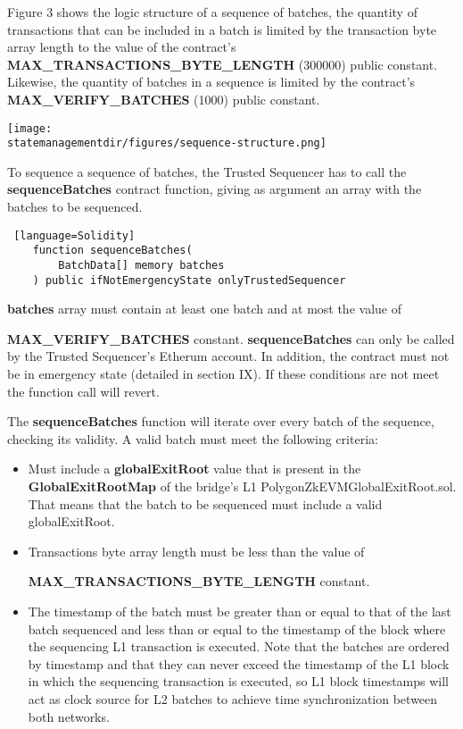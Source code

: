 Figure 3 shows the logic structure of a sequence of batches, the quantity of transactions that can be included in a batch is limited by the transaction byte array length to the value of  the contract's \textbf{MAX\_TRANSACTIONS\_BYTE\_LENGTH} (300000) public constant. Likewise, the quantity of batches in a sequence is limited by the contract's \textbf{MAX\_VERIFY\_BATCHES} (1000) public constant.

\begin{center}
	\texttt{[image: \\statemanagementdir/figures/sequence-structure.png]}
\end{center}


To sequence a sequence of batches, the Trusted Sequencer has to call the \textbf{sequenceBatches} contract function, giving as argument an array with the batches to be sequenced.

\begin{lstlisting} [language=Solidity]
	function sequenceBatches(
		BatchData[] memory batches
	) public ifNotEmergencyState onlyTrustedSequencer	
\end{lstlisting}

\textbf{batches} array must contain at least one batch and at most the value of 

\textbf{MAX\_VERIFY\_BATCHES} constant. \textbf{sequenceBatches} can only be called by the Trusted Sequencer's Etherum account. In addition, the contract must not be in emergency state (detailed in section IX). If these conditions are not meet the function call will revert.

 The \textbf{sequenceBatches} function will iterate over every batch of the sequence, checking its validity. A valid batch must meet the following criteria:
\begin{itemize}
	\item Must include a \textbf{globalExitRoot} value that is present in the \textbf{GlobalExitRootMap} of the bridge's L1 PolygonZkEVMGlobalExitRoot.sol. That means that the batch to be sequenced must include a valid globalExitRoot.  

	\item Transactions byte array length must be less than the value of 

\textbf{MAX\_TRANSACTIONS\_BYTE\_LENGTH} constant.
	
	\item The timestamp of the batch must be greater than or equal to that of the last batch sequenced and less than or equal to the timestamp of the block where the sequencing L1 transaction is executed. Note that the batches are ordered by timestamp and that they can never exceed the timestamp of the L1 block in which the sequencing transaction is executed, so L1 block timestamps will act as clock source for L2 batches to achieve time synchronization between both networks.
\end{itemize}

